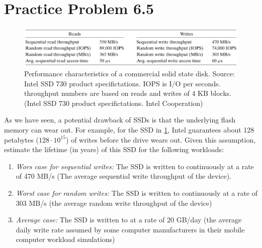\section{Practice Problem 6.5}
\begin{figure}[h!]
    \centering
    \includegraphics[width=\textwidth]{figures/ssd_props.png}
    \caption{Performance characteristics of a commercial solid state disk. 
    Source: Intel SSD 730 product specifictations. IOPS is I/O per seconds.
    throughput numbers are based on reads and writes of 4 KB blocks. (Intel SSD 730 product specifictations. Intel Cooperation)}
    \label{fig:ssd_specs}
\end{figure}
As we have seen, a potential drawback of SSDs is that the underlying flash memory can wear out.
For example, for the SSD in \cref{fig:ssd_specs}, Intel guarantees about 128 petabytes ($128\cdot 10^{15}$) of writes before the drive wears out.
Given this assumption, estimate the lifetime (in years) of this SSD for the following workloads:
\begin{enumerate}
    \item \textit{Wors case for sequential writes:} The SSD is written to continuously at a rate of 470 MB/s (The average sequential write throughput of the device).
    \item \textit{Worst case for random writes:} The SSD is written to continuously at a rate of 303 MB/s (the average random write throughput of the device)
    \item \textit{Average case:} The SSD is written to at a rate of 20 GB/day (the average daily write rate assumed by some computer manufacturers in their mobile computer workload simulations)
\end{enumerate}
